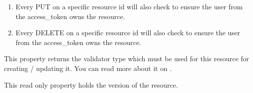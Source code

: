 \documentclass[letterpaper,10pt,english]{sphinxmanual}
\begin{document}
\begin{fulllineitems}
\begin{fulllineitems}
\begin{enumerate}
\begin{description}
\end{description}

\item {} 
Every PUT on a specific resource id will also check to ensure the user from the access\_token owns the resource.

\item {} 
Every DELETE on a specific resource id will also check to ensure the user from the access\_token owns the resource.

\end{enumerate}

\end{fulllineitems}


\begin{fulllineitems}
\label{features/roa/technical_summary:fantastico.roa.resource_decorator.Resource.validator}
This property returns the validator type which must be used for this resource for creating / updating it. You can
read more about it on {\hyperref[features/roa/technical_summary:fantastico.roa.resource_validator.ResourceValidator]{}}.

\end{fulllineitems}


\begin{fulllineitems}
\label{features/roa/technical_summary:fantastico.roa.resource_decorator.Resource.version}
This read only property holds the version of the resource.

\end{fulllineitems}


\end{fulllineitems}

\end{document}
